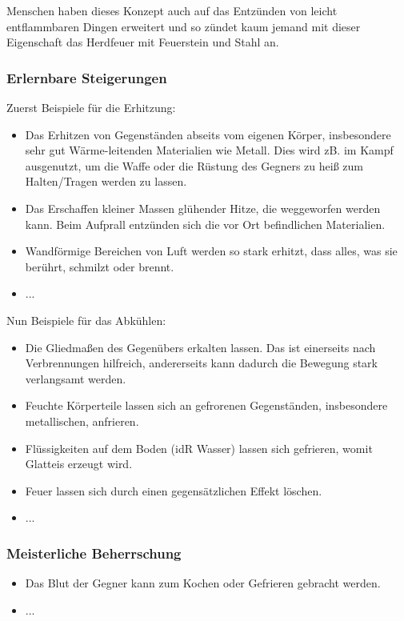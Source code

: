 Menschen haben dieses Konzept auch auf das Entzünden von leicht entflammbaren Dingen erweitert und so zündet kaum jemand mit dieser Eigenschaft das Herdfeuer mit Feuerstein und Stahl an.

\subsubsection{Erlernbare Steigerungen}
Zuerst Beispiele für die Erhitzung:
\begin{itemize}
	\item Das Erhitzen von Gegenständen abseits vom eigenen Körper, insbesondere sehr gut Wärme-leitenden Materialien wie Metall. Dies wird zB. im Kampf ausgenutzt, um die Waffe oder die Rüstung des Gegners zu heiß zum Halten/Tragen werden zu lassen.
	\item Das Erschaffen kleiner Massen glühender Hitze, die weggeworfen werden kann. Beim Aufprall entzünden sich die vor Ort befindlichen Materialien. 
	\item Wandförmige Bereichen von Luft werden so stark erhitzt, dass alles, was sie berührt, schmilzt oder brennt.
	\item ...
\end{itemize}

Nun Beispiele für das Abkühlen:
\begin{itemize}
	\item Die Gliedmaßen des Gegenübers erkalten lassen. Das ist einerseits nach Verbrennungen hilfreich, andererseits kann dadurch die Bewegung stark verlangsamt werden.
	\item Feuchte Körperteile lassen sich an gefrorenen Gegenständen, insbesondere metallischen, anfrieren.
	\item Flüssigkeiten auf dem Boden (idR Wasser) lassen sich gefrieren, womit Glatteis erzeugt wird.
	\item Feuer lassen sich durch einen gegensätzlichen Effekt löschen.
	\item ...
\end{itemize}

\subsubsection{Meisterliche Beherrschung} 
\begin{itemize}
	\item Das Blut der Gegner kann zum Kochen oder Gefrieren gebracht werden.
	\item ...
\end{itemize}



